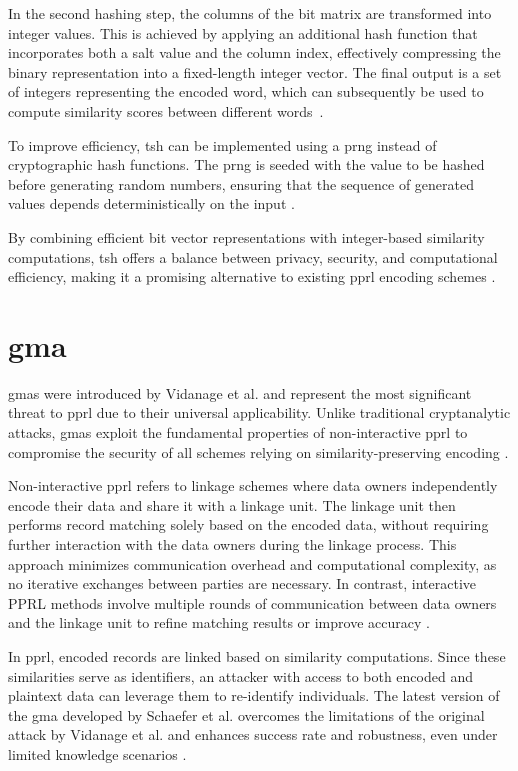 In the second hashing step, the columns of the bit matrix are transformed into integer values.
This is achieved by applying an additional hash function that incorporates both a salt value and the column index, effectively compressing the binary representation into a fixed-length integer vector.
The final output is a set of integers representing the encoded word, which can subsequently be used to compute similarity scores between different words~\cite{ranbaduge2020secure}.

To improve efficiency, \ac{tsh} can be implemented using a \ac{prng} instead of cryptographic hash functions.
The \ac{prng} is seeded with the value to be hashed before generating random numbers, ensuring that the sequence of generated values depends deterministically on the input \cite{ranbaduge2020secure}.

By combining efficient bit vector representations with integer-based similarity computations, \ac{tsh} offers a balance between privacy, security, and computational efficiency, making it a promising alternative to existing \ac{pprl} encoding schemes \cite{vidanage2020graph, ranbaduge2020secure}.

\section{\ac{gma}} \label{sec:gma}

\ac{gma}s  were introduced by Vidanage et al. \cite{vidanage2020graph} and represent the most significant threat to \ac{pprl} due to their universal applicability.
Unlike traditional cryptanalytic attacks, \ac{gma}s exploit the fundamental properties of non-interactive \ac{pprl} to compromise the security of all schemes relying on similarity-preserving encoding \cite{schaefer2024}.


Non-interactive \ac{pprl} refers to linkage schemes where data owners independently encode their data and share it with a linkage unit.
The linkage unit then performs record matching solely based on the encoded data, without requiring further interaction with the data owners during the linkage process.
This approach minimizes communication overhead and computational complexity, as no iterative exchanges between parties are necessary.
In contrast, interactive PPRL methods involve multiple rounds of communication between data owners and the linkage unit to refine matching results or improve accuracy \cite{kum2014privacy}.

In \ac{pprl}, encoded records are linked based on similarity computations.
Since these similarities serve as identifiers, an attacker with access to both encoded and plaintext data can leverage them to re-identify individuals.
The latest version of the \ac{gma} developed by Schaefer et al. \cite{schaefer2024} overcomes the limitations of the original attack by Vidanage et al. \cite{vidanage2020graph} and enhances success rate and robustness, even under limited knowledge scenarios \cite{schaefer2024}.

